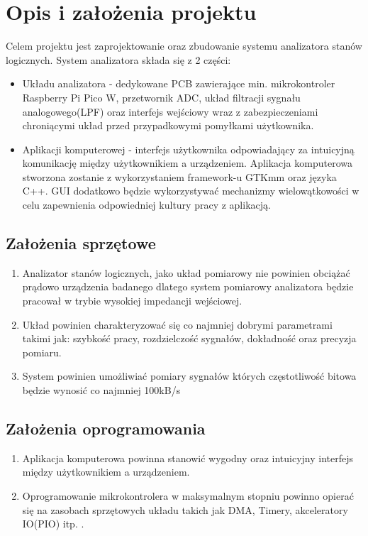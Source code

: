 \section{Opis i założenia projektu}
    Celem projektu jest zaprojektowanie oraz zbudowanie systemu analizatora stanów logicznych.
    System analizatora składa się z 2 części:
    \begin{itemize}
        \item Układu analizatora - dedykowane PCB zawierające min. mikrokontroler
        Raspberry Pi Pico W, przetwornik ADC, układ filtracji sygnału analogowego(LPF)
        oraz interfejs wejściowy wraz z zabezpieczeniami chroniącymi układ przed przypadkowymi
        pomyłkami użytkownika.
        \item Aplikacji komputerowej - interfejs użytkownika odpowiadający za intuicyjną
        komunikację między użytkownikiem a urządzeniem. Aplikacja komputerowa stworzona
        zostanie z wykorzystaniem framework-u GTKmm oraz języka C++.
        GUI dodatkowo będzie wykorzystywać mechanizmy wielowątkowości w celu zapewnienia
        odpowiedniej kultury pracy z aplikacją. 
    \end{itemize}

\subsection{Założenia sprzętowe}
    \begin{enumerate}
        \item Analizator stanów logicznych, jako układ pomiarowy nie powinien obciążać prądowo
        urządzenia badanego dlatego system pomiarowy analizatora będzie pracował w trybie
        wysokiej impedancji wejściowej.
        \item Układ powinien charakteryzować się co najmniej dobrymi parametrami takimi jak:
        szybkość pracy, rozdzielczość sygnałów, dokładność oraz precyzja pomiaru.
        \item System powinien umożliwiać pomiary sygnałów których częstotliwość bitowa będzie
        wynosić co najmniej 100kB/s 
    \end{enumerate}

\subsection{Założenia oprogramowania}
    \begin{enumerate}
        \item Aplikacja komputerowa powinna stanowić wygodny oraz intuicyjny interfejs
        między użytkownikiem a urządzeniem.
        \item Oprogramowanie mikrokontrolera w maksymalnym stopniu powinno opierać się na
        zasobach sprzętowych układu takich jak DMA, Timery, akceleratory IO(PIO) itp. .
    \end{enumerate}
    
